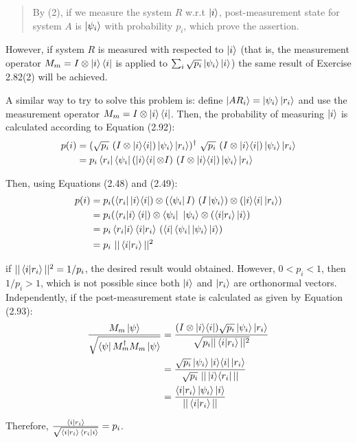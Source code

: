 \begin{enumerate}
\begin{quotation}
        By (2), if we measure the system $R$ w.r.t $\ket{i}$, post-measurement state for system $A$ is $\ket{\psi_i}$ with probability $p_i$, which prove the assertion.
    \end{quotation}
    
    
    However, if system $R$ is measured with respected to $\ket{i}$
    (that is, the measurement operator $M_m = I \otimes \ket{i}\bra{i}$
    is applied to $\sum_i \sqrt{p_i} \ket{\psi_i}\ket{i}$)
    the same result of Exercise 2.82(2) will be achieved.
    
    A similar way to try to solve this problem is:
    define $\ket{AR_i} = \ket{\psi_i}\ket{r_i}$
    and use the measurement operator $M_m = I \otimes \ket{i}\bra{i}$.
    Then, the probability of measuring $\ket{i}$ is calculated
    according to Equation (2.92):
    \begin{align}
        p(i) &= (\sqrt{p_i}\ (I \otimes \mathop{\mathinner{ |{i}\rangle \langle{i}|}}) \ket{\psi_i}\ket{r_i})^\dagger
            \ \sqrt{p_i}\ (I \otimes \mathop{\mathinner{ |{i}\rangle \langle{i}|}}) \ket{\psi_i}\ket{r_i} \\
        &= p_i \bra{r_i}\bra{\psi_i} (\mathop{\mathinner{ |{i}\rangle \langle{i}|}} \otimes I)
            \ (I \otimes \mathop{\mathinner{ |{i}\rangle \langle{i}|}}) \ket{\psi_i}\ket{r_i}
    \end{align}
    
    Then, using Equations (2.48) and (2.49):
    \begin{align}
        p(i) &= p_i  (\bra{r_i} \mathop{\mathinner{ |{i}\rangle \langle{i}|}}) \otimes (\bra{\psi_i} I)
            \ (I \ket{\psi_i}) \otimes (\mathop{\mathinner{ |{i}\rangle \langle{i}|}} \ket{r_i}) \\
        &= p_i (\mathop{\mathinner{ \langle{r_i}|{i}\rangle}} \bra{i}) \otimes \bra{\psi_i}
            \ \ket{\psi_i} \otimes (\mathop{\mathinner{ \langle{i}|{r_i}\rangle}} \ket{i}) \\
        &= p_i \mathop{\mathinner{ \langle{r_i}|{i}\rangle}} \mathop{\mathinner{ \langle{i}|{r_i}\rangle}}\ (\bra{i} \bra{\psi_i} \ket{\psi_i} \ket{i}) \\
        &= p_i\ ||\mathop{\mathinner{ \langle{i}|{r_i}\rangle}}||^2
    \end{align}
    
    if $||\mathop{\mathinner{ \langle{i}|{r_i}\rangle}}||^2 = 1/p_i$, the desired result would obtained.
    However, $0 < p_i < 1$, then $1/p_i > 1$, which is not possible
    since both $\ket{i}$ and $\ket{r_i}$ are orthonormal vectors.
    Independently, if the post-measurement state is calculated as given by Equation (2.93):
    \begin{align}
        \frac{M_m\ket{\psi}}{\sqrt{\bra{\psi}M_m^\dagger M_m\ket{\psi}}} &=
            \frac{(I \otimes \mathop{\mathinner{ |{i}\rangle \langle{i}|}})\sqrt{p_i}\ket{\psi_i}\ket{r_i}}
            {\sqrt{p_i ||\mathop{\mathinner{ \langle{i}|{r_i}\rangle}}||^2}} \\
        &= \frac{\sqrt{p_i} \ket{\psi_i} \mathop{\mathinner{ |{i}\rangle \langle{i}|}} \ket{r_i}}
            {\sqrt{p_i}\ ||\mathop{\mathinner{ |{i}\rangle \langle{r_i}|}}||} \\
        &= \frac{\mathop{\mathinner{ \langle{i}|{r_i}\rangle}} \ket{\psi_i} \ket{i}}{||\mathop{\mathinner{ \langle{i}|{r_i}\rangle}}||}
    \end{align}
    
    Therefore, $\frac{\mathop{\mathinner{ \langle{i}|{r_i}\rangle}}}{\sqrt{\mathop{\mathinner{ \langle{i}|{r_i}\rangle}}\mathop{\mathinner{ \langle{r_i}|{i}\rangle}}}} = p_i$.
    
\end{enumerate}